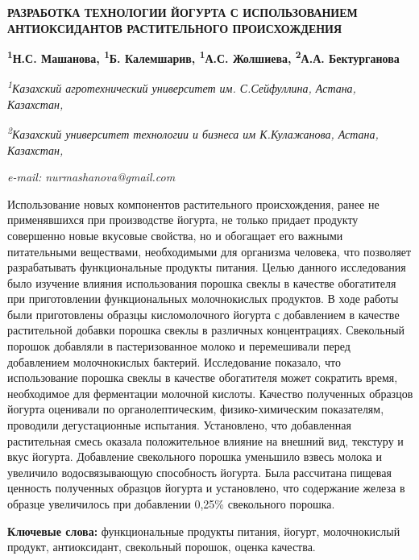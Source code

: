 \begin{articleheader}
{\bfseries РАЗРАБОТКА ТЕХНОЛОГИИ ЙОГУРТА С ИСПОЛЬЗОВАНИЕМ АНТИОКСИДАНТОВ РАСТИТЕЛЬНОГО ПРОИСХОЖДЕНИЯ}

{\bfseries
\textsuperscript{1}Н.С. Машанова\textsuperscript{\envelope },
\textsuperscript{1}Б. Калемшарив,
\textsuperscript{1}А.С. Жолшиева,
\textsuperscript{2}А.А. Бектурганова}
\end{articleheader}

\begin{affiliation}
\emph{\textsuperscript{1}Казахский агротехнический университет им. С.Сейфуллина, Астана, Казахстан,}

\emph{\textsuperscript{2}Казахский университет технологии и бизнеса им К.Кулажанова, Астана, Казахстан,}

\emph{e-mail: nurmashanova@gmail.com}
\end{affiliation}

Использование новых компонентов растительного происхождения, ранее не
применявшихся при производстве йогурта, не только придает продукту
совершенно новые вкусовые свойства, но и обогащает его важными
питательными веществами, необходимыми для организма человека, что
позволяет разрабатывать функциональные продукты питания. Целью данного
исследования было изучение влияния использования порошка свеклы в
качестве обогатителя при приготовлении функциональных молочнокислых
продуктов. В ходе работы были приготовлены образцы кисломолочного
йогурта с добавлением в качестве растительной добавки порошка свеклы в
различных концентрациях. Свекольный порошок добавляли в пастеризованное
молоко и перемешивали перед добавлением молочнокислых бактерий.
Исследование показало, что использование порошка свеклы в качестве
обогатителя может сократить время, необходимое для ферментации молочной
кислоты. Качество полученных образцов йогурта оценивали по
органолептическим, физико-химическим показателям, проводили
дегустационные испытания. Установлено, что добавленная растительная
смесь оказала положительное влияние на внешний вид, текстуру и вкус
йогурта. Добавление свекольного порошка уменьшило взвесь молока и
увеличило водосвязывающую способность йогурта. Была рассчитана пищевая
ценность полученных образцов йогурта и установлено, что содержание
железа в образце увеличилось при добавлении 0,25\% свекольного порошка.

{\bfseries Ключевые слова:} функциональные продукты питания, йогурт,
молочнокислый продукт, антиоксидант, свекольный порошок, оценка
качества.

